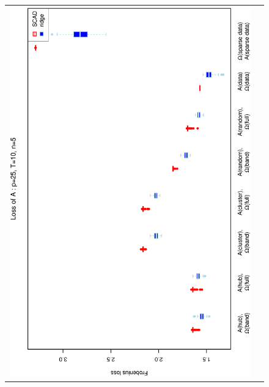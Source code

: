 \documentclass[a4paper]{article}
\begin{document}
\begin{figure}[h!]
\centering
\begin{tabular}{cc}
\includegraphics[scale=0.5,angle=270]{LossA25T10N5.eps}\\

\end{tabular}
\end{figure}
\end{document}
